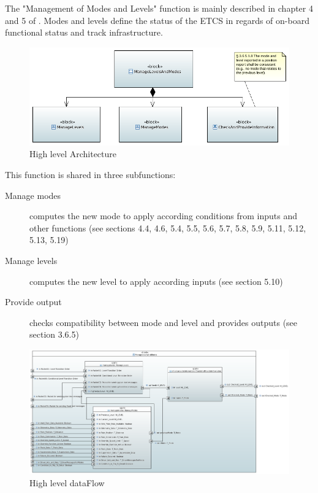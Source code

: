 


The "Management of Modes and Levels" function is mainly described in chapter 4 and 5 of \citep{subset-026}. Modes and levels define the status of the ETCS in regards of on-board functional status and track infrastructure.

\begin{landscape}
\begin{figure}[hbtp]
\centering
\includegraphics[scale=1]{../SysML/FunctionalArchitecture.png}
\caption{High level Architecture}
\end{figure}
\end{landscape}

This function is shared in three subfunctions: 
\begin{description}
\item[Manage modes] computes the new mode to apply according conditions from inputs and other functions (see \citep{subset-026} sections 4.4, 4.6, 5.4, 5.5, 5.6, 5.7, 5.8, 5.9, 5.11, 5.12, 5.13, 5.19)
\item[Manage levels] computes the new level to apply according inputs (see \citep{subset-026} section 5.10)
\item[Provide output] checks compatibility between mode and level and provides outputs (see \citep{subset-026} section 3.6.5)
\end{description}

\begin{landscape}
\begin{figure}[hbtp]
\centering
\includegraphics[scale=0.6]{../SysML/ManageLevelsAndModes.png}
\caption{High level dataFlow}
\end{figure}
\end{landscape}


